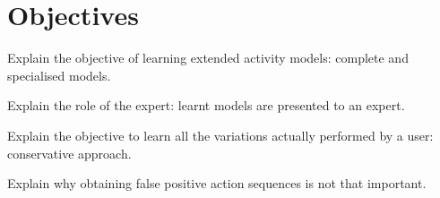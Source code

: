 \section{Objectives}
\label{sec:learner:objectives}

Explain the objective of learning extended activity models: complete and specialised models.

Explain the role of the expert: learnt models are presented to an expert.

Explain the objective to learn all the variations actually performed by a user: conservative approach.

Explain why obtaining false positive action sequences is not that important.